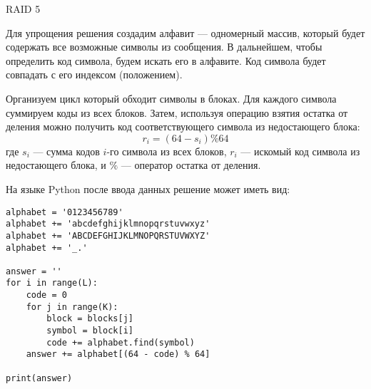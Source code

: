 \begin{tutorial}{RAID 5}

Для упрощения решения создадим алфавит --- одномерный массив, который будет содержать все возможные символы из сообщения. В дальнейшем, чтобы определить код символа, будем искать его в алфавите. Код символа будет совпадать с его индексом (положением).

Организуем цикл который обходит символы в блоках. Для каждого символа суммируем коды из всех блоков. Затем, используя операцию взятия остатка от деления можно получить код соответствующего символа из недостающего блока:
$$
r_i = (64 - s_i) \% 64
$$
где $s_i$ --- сумма кодов $i$-го символа из всех блоков, $r_i$ --- искомый код символа из недостающего блока, и $\%$ --- оператор остатка от деления. 

На языке Python после ввода данных решение может иметь вид:

\begin{verbatim}
alphabet = '0123456789'
alphabet += 'abcdefghijklmnopqrstuvwxyz'
alphabet += 'ABCDEFGHIJKLMNOPQRSTUVWXYZ'
alphabet += '_.'

answer = ''
for i in range(L):
    code = 0
    for j in range(K):
        block = blocks[j]
        symbol = block[i]
        code += alphabet.find(symbol)
    answer += alphabet[(64 - code) % 64]

print(answer)
\end{verbatim}

\end{tutorial}
